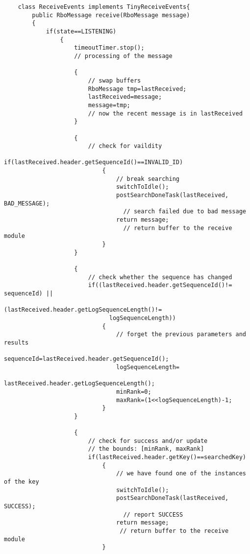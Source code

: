 \documentclass{letter}
\begin{document}
\begin{verbatim}
    class ReceiveEvents implements TinyReceiveEvents{
        public RboMessage receive(RboMessage message)
        {
            if(state==LISTENING)
                {
                    timeoutTimer.stop(); 
                    // processing of the message

                    {
                        // swap buffers 
                        RboMessage tmp=lastReceived;
                        lastReceived=message;
                        message=tmp;
                        // now the recent message is in lastReceived
                    }

                    {
                        // check for vaildity
                        if(lastReceived.header.getSequenceId()==INVALID_ID)
                            {
                                // break searching
                                switchToIdle();
                                postSearchDoneTask(lastReceived, BAD_MESSAGE); 
                                  // search failed due to bad message
                                return message; 
                                  // return buffer to the receive module
                            }
                    }

                    {
                        // check whether the sequence has changed
                        if((lastReceived.header.getSequenceId()!= sequenceId) || 
                           (lastReceived.header.getLogSequenceLength()!=
                              logSequenceLength))
                            {
                                // forget the previous parameters and results
                                sequenceId=lastReceived.header.getSequenceId();
                                logSequenceLength=
                                  lastReceived.header.getLogSequenceLength();
                                minRank=0;
                                maxRank=(1<<logSequenceLength)-1;
                            }
                    }

                    {
                        // check for success and/or update 
                        // the bounds: [minRank, maxRank]
                        if(lastReceived.header.getKey()==searchedKey)
                            {
                                // we have found one of the instances of the key
                                switchToIdle();
                                postSearchDoneTask(lastReceived, SUCCESS); 
                                  // report SUCCESS
                                return message; 
                                 // return buffer to the receive module
                            }


\end{verbatim}
\end{document}
